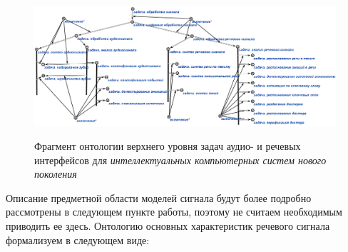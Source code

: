 \begin{figure}[H]
    \caption{Фрагмент онтологии верхнего уровня задач аудио- и речевых интерфейсов для \textit{интеллектуальных компьютерных систем нового поколения}}
    \includegraphics[scale=1.0, width=1.0\textwidth]{author/part4/figures/ch43_fig04_audio-and-speech-tasks-formalization-ru.png}
    \label{fig:audio-and-speech-tasks-formalization-ru}
\end{figure}

Описание предметной области моделей сигнала будут более подробно рассмотрены в следующем пункте работы, поэтому не считаем необходимым приводить ее здесь.
Онтологию основных характеристик речевого сигнала формализуем в следующем виде:

